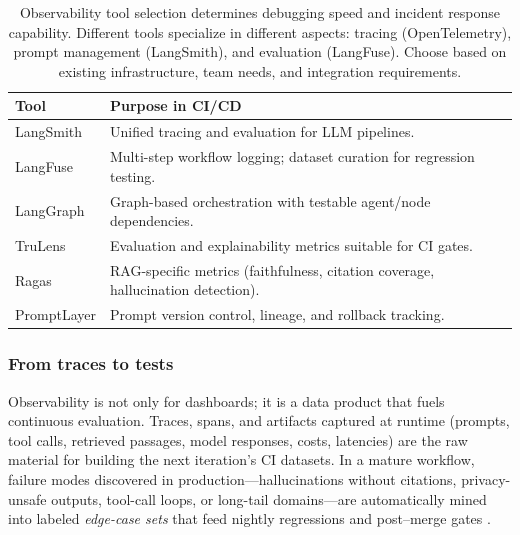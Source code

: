 \begin{table}[t]
  \centering
  \small
  \caption{Observability tool selection determines debugging speed and incident response capability. Different tools specialize in different aspects: tracing (OpenTelemetry), prompt management (LangSmith), and evaluation (LangFuse). Choose based on existing infrastructure, team needs, and integration requirements.}
  \label{tab:ch04_obs_tools}
  \setlength{\tabcolsep}{6pt}
  \renewcommand{\arraystretch}{1.3}
  \begin{tabularx}{0.95\linewidth}{@{}l X@{}}
    \toprule
    \rowcolor{gray!15}
    \textbf{Tool} & \textbf{Purpose in CI/CD} \\
    \midrule
    LangSmith & Unified tracing and evaluation for LLM pipelines. \\
    LangFuse  & Multi-step workflow logging; dataset curation for regression testing. \\
    LangGraph & Graph-based orchestration with testable agent/node dependencies. \\
    TruLens   & Evaluation and explainability metrics suitable for CI gates. \\
    Ragas     & RAG-specific metrics (faithfulness, citation coverage, hallucination detection). \\
    PromptLayer & Prompt version control, lineage, and rollback tracking. \\
    \bottomrule
  \end{tabularx}
\end{table}

\subsubsection{From traces to tests}
Observability is not only for dashboards; it is a data product that fuels continuous evaluation. Traces, spans, and artifacts captured at runtime (prompts, tool calls, retrieved passages, model responses, costs, latencies) are the raw material for building the next iteration's CI datasets. In a mature workflow, failure modes discovered in production---hallucinations without citations, privacy-unsafe outputs, tool-call loops, or long-tail domains---are automatically mined into labeled \emph{edge-case sets} that feed nightly regressions and post--merge gates \cite{trulens,ragas_eacl2024,phoenix_rag,mlflow_llm_eval}.

